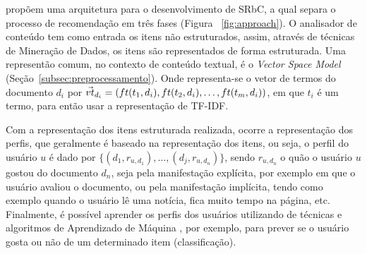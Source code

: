 \documentclass[normaltoc, espacoumemeio, pnumromarab,ruledheader]{abnt}
\begin{document}
 propõem uma arquitetura para o desenvolvimento de SRbC, a qual separa o processo de recomendação em três fases (Figura ~\ref{fig:approach}). O analisador de conteúdo tem como entrada os itens não estruturados, assim, através de técnicas de Mineração de Dados, os itens são representados de forma estruturada.
Uma representão comum, no contexto de conteúdo textual, é o \textit{Vector Space Model} \cite{Adomavicius2005,Lops2011,Jannach2011} (Seção~\ref{subsec:preprocessamento}).
Onde representa-se o vetor de termos do documento $d_i$ por $\vec{vt}_{d_i} = ( ft(t_1, d_i),\\ ft(t_2, d_i), \dots, ft(t_m, d_i) )$, em que $t_i$ é um termo, para então usar a representação de TF-IDF.



Com a representação dos itens estruturada realizada, ocorre a representação dos perfis, que geralmente é baseado na representação dos itens, ou seja, o perfil do usuário $u$ é dado por $\{ (d_1, r_{u,d_1}), \dots, (d_j, r_{u,d_n}) \}$, sendo $r_{u,d_n}$ o quão o usuário $u$ gostou do documento $d_n$, seja pela manifestação explícita, por exemplo em que o usuário avaliou o documento, ou pela manifestação implícita, tendo como exemplo quando o usuário lê uma notícia, fica muito tempo na página, etc.
Finalmente, é possível aprender os perfis dos usuários utilizando de técnicas e algoritmos de Aprendizado de Máquina \cite{Adomavicius2005,Lops2011,Jannach2011}, por exemplo, para prever se o usuário gosta ou não de um determinado item (classificação).
\end{document}
